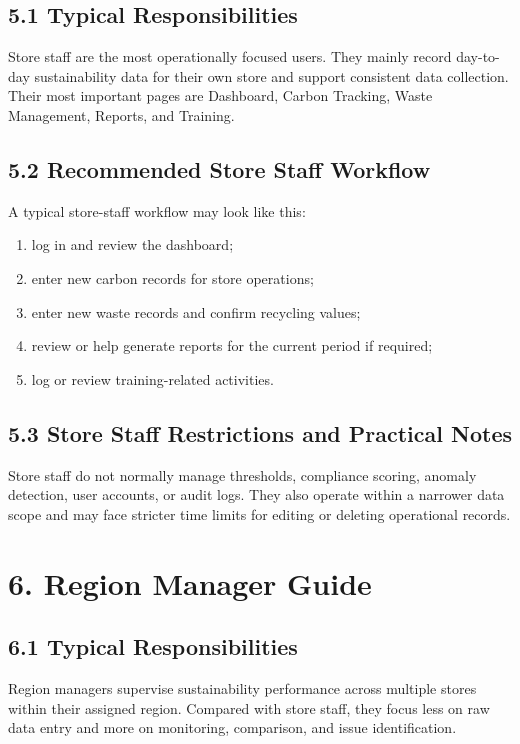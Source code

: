 \documentclass[10pt,a4paper]{article}
\begin{document}
\subsection*{5.1 Typical Responsibilities}
Store staff are the most operationally focused users. They mainly record day-to-day sustainability data for their own store and support consistent data collection. Their most important pages are Dashboard, Carbon Tracking, Waste Management, Reports, and Training.


\subsection*{5.2 Recommended Store Staff Workflow}
A typical store-staff workflow may look like this:
\begin{enumerate}[leftmargin=1.5em,itemsep=2pt,topsep=2pt]
    \item log in and review the dashboard;
    \item enter new carbon records for store operations;
    \item enter new waste records and confirm recycling values;
    \item review or help generate reports for the current period if required;
    \item log or review training-related activities.
\end{enumerate}


\subsection*{5.3 Store Staff Restrictions and Practical Notes}
Store staff do not normally manage thresholds, compliance scoring, anomaly detection, user accounts, or audit logs. They also operate within a narrower data scope and may face stricter time limits for editing or deleting operational records.


\section*{6. Region Manager Guide}

\subsection*{6.1 Typical Responsibilities}
Region managers supervise sustainability performance across multiple stores within their assigned region. Compared with store staff, they focus less on raw data entry and more on monitoring, comparison, and issue identification.
\end{document}
